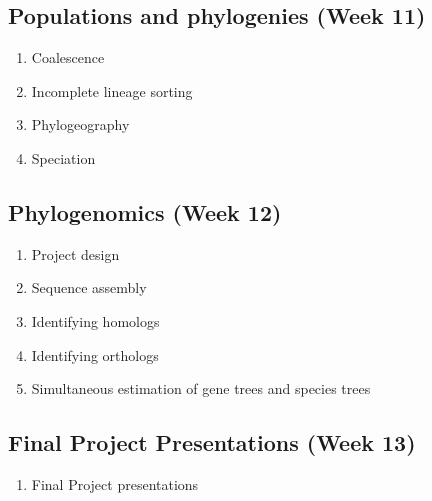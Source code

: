 \documentclass[12pt]{article}
\begin{document}
\subsection*{Populations and phylogenies \textnormal{\small{(Week 11)}}}

\begin{enumerate}
\item Coalescence
\item Incomplete lineage sorting
\item Phylogeography
\item Speciation
\end{enumerate}

\subsection*{Phylogenomics \textnormal{\small{(Week 12)}}}
\begin{enumerate}
\item Project design
\item Sequence assembly
\item Identifying homologs
\item Identifying orthologs
\item Simultaneous estimation of gene trees and species trees
\end{enumerate}

\subsection*{Final Project Presentations \textnormal{\small{(Week 13)}}}

\begin{enumerate}
\item Final Project presentations


\end{enumerate}
\end{document}
